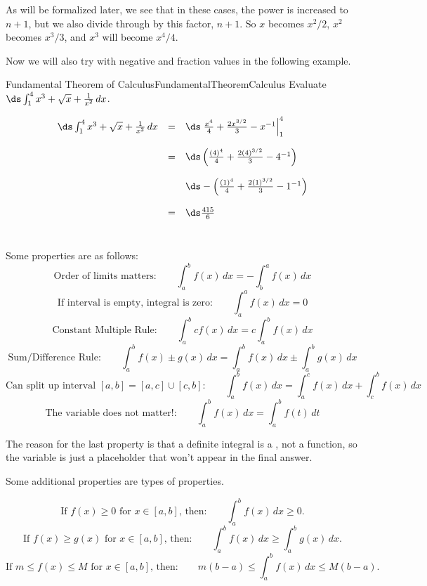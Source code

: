 As will be formalized later, we see that in these cases, the power is increased to $n+1$, but we also divide through by this factor, $n+1$. So $x$ becomes $x^2/2$, $x^2$ becomes $x^3/3$, and $x^3$ will become $x^4/4$.

Now we will also try with negative and fraction values in the following example.

\begin{example}{Fundamental Theorem of Calculus}{FundamentalTheoremCalculus}
Evaluate $\ds\int_1^4 x^3+\sqrt{x}+\frac{1}{x^2}\,dx $.
\end{example}

\begin{solution}
\[ \begin{array}{lcl}
\ds\int_1^4 x^3+\sqrt{x}+\frac{1}{x^2}\,dx 
	& = & \ds\left.\frac{x^4}{4}+\frac{2x^{3/2}}{3}-x^{-1}\right|_1^4\\
\\
	& = & \ds\left(\frac{(4)^4}{4}+\frac{2(4)^{3/2}}{3}-4^{-1}\right) \\
\\
	& & \ds-\left(\frac{(1)^4}{4}+\frac{2(1)^{3/2}}{3}-1^{-1}\right)\\
\\
	& = & \ds\frac{415}{6}
\end{array}\]\
\end{solution}

\begin{formulabox}
Some properties are as follows:
$$\mbox{Order of limits matters:}\qquad\int_a^b f(x)\,dx=-\int_b^a f(x)\,dx$$
$$\mbox{If interval is empty, integral is zero:}\qquad\int_a^a f(x)\,dx=0$$
$$\mbox{Constant Multiple Rule:}\qquad\int_a^b cf(x)\,dx=c\int_a^b f(x)\,dx$$
$$\mbox{Sum/Difference Rule:}\qquad\int_a^b f(x)\pm g(x)\,dx=\int_a^b f(x)\,dx\pm\int_a^b g(x)\,dx$$
$$\mbox{Can split up interval $[a,b]=[a,c]\cup[c,b]$:}\qquad\int_a^b f(x)\,dx=\int_a^c f(x)\,dx+\int_c^b f(x)\,dx$$
$$\mbox{The variable does not matter!:}\qquad\int_a^b f(x)\,dx=\int_a^b f(t)\,dt$$
\end{formulabox}

The reason for the last property is that a definite integral is a , not a function, so the variable is just a placeholder that won't appear in the final answer.

Some additional properties are  types of properties.

\begin{formulabox}
$$\mbox{If $f(x)\geq 0$ for $x\in[a,b]$, then:}\qquad\int_a^b f(x)\,dx\geq 0.$$
$$\mbox{If $f(x)\geq g(x)$ for $x\in[a,b]$, then:}\qquad\int_a^b f(x)\,dx\geq \int_a^b g(x)\,dx.$$
$$\mbox{If $m\leq f(x)\leq M$ for $x\in[a,b]$, then:}\qquad m(b-a)\leq \int_a^b f(x)\,dx\leq M(b-a).$$
\end{formulabox}

